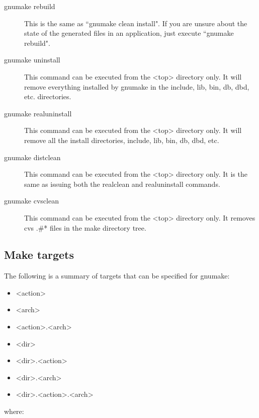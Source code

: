 \begin{description}
\item[gnumake rebuild]  

This is the same as ``gnumake clean install". If you are unsure about the state of the generated files in an application, just execute ``gnumake rebuild".

\item[gnumake uninstall]  

This command can be executed from the \textless{}top\textgreater{} directory only. It will remove everything installed by gnumake in the include, lib, bin, db, dbd, etc. directories.

\item[gnumake realuninstall]  
This command can be executed from the \textless{}top\textgreater{} directory only. It will remove all the install directories, include, lib, bin, db, dbd, etc.

\item[gnumake distclean]  

This command can be executed from the \textless{}top\textgreater{} directory only. It is the same as issuing both the realclean and 
realuninstall commands.

\item[gnumake cvsclean]  

This command can be executed from the \textless{}top\textgreater{} directory only. It removes cvs .\#* files in the make directory tree.

\end{description}

\subsection{Make targets}

The following is a summary of targets that can be specified for gnumake: 

\begin{itemize}\item \textless{}action\textgreater{}

\item \textless{}arch\textgreater{}

\item \textless{}action\textgreater{}.\textless{}arch\textgreater{}

\item \textless{}dir\textgreater{}

\item \textless{}dir\textgreater{}.\textless{}action\textgreater{}

\item  \textless{}dir\textgreater{}.\textless{}arch\textgreater{}

\item \textless{}dir\textgreater{}.\textless{}action\textgreater{}.\textless{}arch\textgreater{}

\end{itemize}where: 


